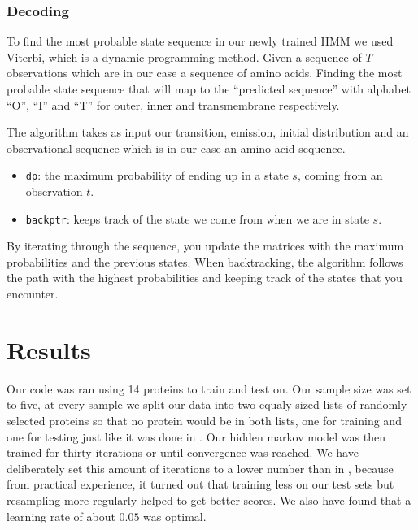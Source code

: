\documentclass[
	a4paper, %
	11pt, %
	unnumberedsections, %
	twoside, %
  ]{LTJournalArticle}
\begin{document}
\subsubsection{Decoding}

To find the most probable state sequence in our newly trained HMM we used Viterbi, which is a dynamic programming method. Given a sequence of $T$ observations which are in our case a sequence of amino acids. Finding the most probable state sequence that will map to the ``predicted sequence'' with alphabet ``O'', ``I'' and ``T'' for outer, inner and transmembrane respectively. \cite{rabiner_tutorial_1989}

The algorithm takes as input our transition, emission, initial distribution and an observational sequence which is in our case an amino acid sequence.

\begin{itemize}
  \item{\texttt{dp}: the maximum probability of ending up in a state $s$, coming from an observation $t$.}
  \item{\texttt{backptr}}: keeps track of the state we come from when we are in state $s$.
\end{itemize}

By iterating through the sequence, you update the matrices with the maximum probabilities and the previous states. When backtracking, the algorithm follows the path with the highest probabilities and keeping track of the states that you encounter.



\section{Results}

Our code was ran using 14 proteins to train and test on. Our sample size was set to five, at every sample we split our data into two equaly sized lists of randomly selected proteins so that no protein would be in both lists, one for training and one for testing just like it was done in \cite{bagos_hidden_2004}. Our hidden markov model was then trained for thirty iterations or until convergence was reached. We have deliberately set this amount of iterations to a lower number than in \cite{bagos_hidden_2004}, because from practical experience, it turned out that training less on our test sets but resampling more regularly helped to get better scores. We also have found that a learning rate of about $0.05$ was optimal.
\end{document}
